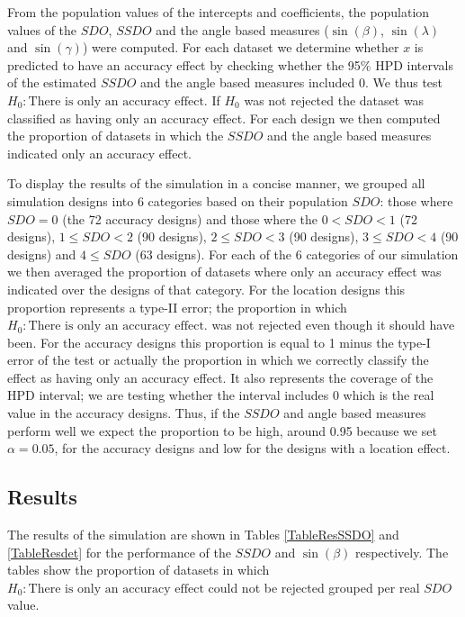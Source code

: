 \documentclass[11pt,]{article}
\begin{document}
From the population values of the intercepts and coefficients, the
population values of the \(SDO\), \(SSDO\) and the angle based measures
(\(\sin(\beta)\), \(\sin(\lambda)\) and \(\sin(\gamma)\)) were computed.
For each dataset we determine whether \(x\) is predicted to have an
accuracy effect by checking whether the 95\(\%\) HPD intervals of the
estimated \(SSDO\) and the angle based measures included 0. We thus test
\textit{$H_0: \text{There is only an accuracy effect}$}. If
\textit{$H_0$} was not rejected the dataset was classified as having
only an accuracy effect. For each design we then computed the proportion
of datasets in which the \(SSDO\) and the angle based measures indicated
only an accuracy effect.

To display the results of the simulation in a concise manner, we grouped
all simulation designs into 6 categories based on their population
\(SDO\): those where \(SDO = 0\) (the 72 accuracy designs) and those
where the \(0 < SDO < 1\) (72 designs), \(1 \leq SDO < 2\) (90 designs),
\(2 \leq SDO < 3\) (90 designs), \(3 \leq SDO < 4\) (90 designs) and
\(4 \leq SDO\) (63 designs). For each of the 6 categories of our
simulation we then averaged the proportion of datasets where only an
accuracy effect was indicated over the designs of that category. For the
location designs this proportion represents a type-II error; the
proportion in which
\textit{$H_0: \text{There is only an accuracy effect.}$} was not
rejected even though it should have been. For the accuracy designs this
proportion is equal to 1 minus the type-I error of the test or actually
the proportion in which we correctly classify the effect as having only
an accuracy effect. It also represents the coverage of the HPD interval;
we are testing whether the interval includes 0 which is the real value
in the accuracy designs. Thus, if the \(SSDO\) and angle based measures
perform well we expect the proportion to be high, around 0.95 because we
set \(\alpha = 0.05\), for the accuracy designs and low for the designs
with a location effect.

\subsection{Results}\label{results}

The results of the simulation are shown in Tables \ref{TableResSSDO} and
\ref{TableResdet} for the performance of the \(SSDO\) and
\(\sin(\beta)\) respectively. The tables show the proportion of datasets
in which \textit{$H_0:
\text{There is only an accuracy effect}$} could not be rejected grouped
per real \(SDO\) value.
\end{document}
